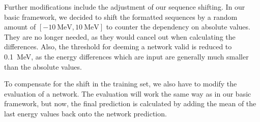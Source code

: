 Further modifications include the adjustment of our sequence shifting. In our basic framework, we decided to shift the formatted sequences by a random amount of $[\SI{-10}{\mega\electronvolt}, \SI{10}{\mega\electronvolt}]$ to counter the dependency on absolute values. They are no longer needed, as they would cancel out when calculating the differences. Also, the threshold for deeming a network valid is reduced to \SI{0.1}{\mega\electronvolt}, as the energy differences which are input are generally much smaller than the absolute values.

To compensate for the shift in the training set, we also have to modify the evaluation of a network. The evaluation will work the same way as in our basic framework, but now, the final prediction is calculated by adding the mean of the last energy values back onto the network prediction.
